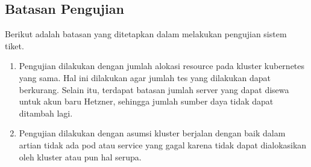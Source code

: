 \subsection{Batasan Pengujian}

Berikut adalah batasan yang ditetapkan dalam melakukan pengujian sistem tiket.

\begin{enumerate}
  \item Pengujian dilakukan dengan jumlah alokasi resource pada kluster kubernetes yang sama. Hal ini dilakukan agar jumlah tes yang dilakukan dapat berkurang. Selain itu, terdapat batasan jumlah server yang dapat disewa untuk akun baru Hetzner, sehingga jumlah sumber daya tidak dapat ditambah lagi.
  \item Pengujian dilakukan dengan asumsi kluster berjalan dengan baik dalam artian tidak ada pod atau service yang gagal karena tidak dapat dialokasikan oleh kluster atau pun hal serupa.
\end{enumerate}
